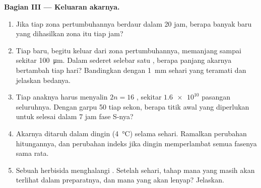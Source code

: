 \begin{problem}
\medskip
\noindent\textbf{Bagian III --- Keluaran akarnya.}
\begin{enumerate}[resume]
  \item Jika tiap  zona pertumbuhannya berdaur dalam 20 jam, berapa
        banyak  baru yang dihasilkan zona itu tiap jam?
  \item Tiap  baru, begitu keluar dari zona pertumbuhannya,
        memanjang sampai sekitar \qty{100}{\micro m}. Dalam sederet 
        selebar satu , berapa panjang akarnya bertambah tiap hari?
        Bandingkan dengan \qty{1}{mm} sehari yang teramati dan jelaskan bedanya.
  \item Tiap  anaknya harus menyalin $2n = 16$ , sekitar
        $\num{1.6e10}$ pasangan  seluruhnya. Dengan garpu 50
         tiap sekon, berapa titik awal yang diperlukan untuk
        selesai dalam 7 jam fase S-nya?
  \item Akarnya ditaruh dalam dingin (\qty{4}{\celsius}) selama sehari.
        Ramalkan perubahan hitungannya, dan perubahan indeks 
        jika dingin memperlambat semua fasenya sama rata.
  \item Sebuah herbisida menghalangi . Setelah sehari,
        tahap mana yang masih akan terlihat dalam preparatnya, dan mana
        yang akan lenyap? Jelaskan.
\end{enumerate}


\end{problem}
